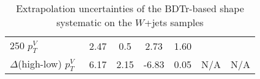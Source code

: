 \begin{table}[!htb]
{\begin{tabular}{lS[table-format=3.2]S[table-format=3.2]S[table-format=3.2]S[table-format=3.2]S[table-format=3.2]S[table-format=3.2]}
      250 $p_T^V$\                  &  2.47  & 0.5\footnotemark[1]  & 2.73  & 1.60 &        &        \\
      $\Delta$(high-low) $p_T^V$\   &  6.17  & 2.15  & -6.83 & 0.05 &   N/A      &    N/A  \\
      \bottomrule
    \end{tabular}
  }
  \caption{Extrapolation uncertainties of the BDTr-based shape systematic on the
    $W$+jets samples}
  \label{tab:wjets-extrapolation_uncertainties_BDTr}
\end{table}